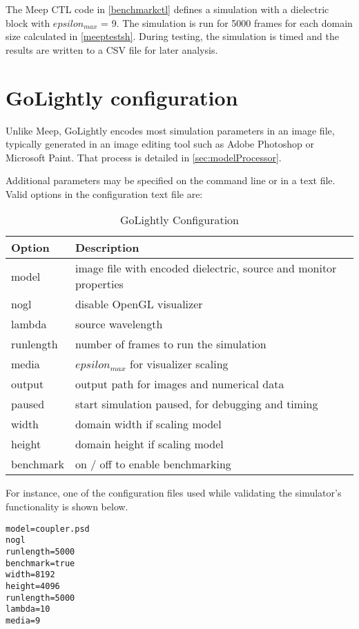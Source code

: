 


The Meep CTL code in \autoref{benchmarkctl} defines a simulation with a dielectric block with $epsilon_{max}$ = 9. The simulation is run for 5000 frames for each domain size calculated in \autoref{meeptestsh}. During testing, the simulation is timed and the results are written to a CSV file for later analysis. 



\section{GoLightly configuration}

Unlike Meep, GoLightly encodes most simulation parameters in an image file, typically generated in an image editing tool such as Adobe Photoshop or Microsoft Paint. That process is detailed in \autoref{sec:modelProcessor}. 

Additional parameters may be specified on the command line or in a text file. Valid options in the configuration text file are:

\begin{table}[h!]
	\label{golightlyConfig}
	\centering
	\caption{GoLightly Configuration}
	\label{tab:golightlyConfigTerms}
	\begin{tabular}{l | l}
		Option	& Description \\
		\hline
			model     & image file with encoded dielectric, source and monitor properties \\
			nogl      & disable OpenGL visualizer										  \\
			lambda    & source wavelength												  \\
			runlength & number of frames to run the simulation							  \\
			media     & $epsilon_{max}$  for visualizer scaling								  \\
			output    & output path for images and numerical data						  \\
			paused    & start simulation paused, for debugging and timing				  \\
			width     & domain width if scaling model									  \\
			height    & domain height if scaling model									  \\
			benchmark & on / off to enable benchmarking									  \\
	\end{tabular}
\end{table}

For instance, one of the configuration files used while validating the simulator's functionality is shown below.

\begin{lstlisting}[caption={Samply GoLightly Configuration File},label={listing:sampleGolightlyConfig}]
model=coupler.psd
nogl
runlength=5000
benchmark=true
width=8192
height=4096
runlength=5000
lambda=10
media=9
\end{lstlisting}




